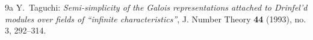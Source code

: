 \documentclass[10pt]{amsart}
\theoremstyle{plain}
\theoremstyle{definition}
\begin{document}
\begin{thebibliography}{9a}
Y.~Taguchi:
\emph{Semi-simplicity of the Galois representations attached to Drinfel'd modules over fields of ``infinite characteristics''},
J. Number Theory \textbf{44} (1993), no. 3, 292--314. 













\end{thebibliography}
\end{document}
